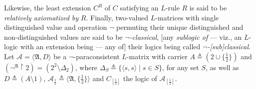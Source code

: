 \documentclass[bsl,meeting]{asl}
\newcommand{\mf}[1]{\mathfrak{#1}}
\newcommand{\mc}[1]{\mathcal{#1}}
\newcommand{\mbf}[1]{\mathbf{#1}}
\newcommand{\couple}[2]{\langle{#1},{#2}\rangle}
\newcommand{\restr}{{\upharpoonright}}
\def\e{{\frac{1}{2}} }
\begin{document}
Likewise, the least extension $C^R$ of $C$
satisfying an $L$-rule $R$
is said to be {\em
relatively axiomatized by\/} $R$.
Finally, two-valued $L$-matrices
with single
distinguished value %
and operation $\neg$ %
permuting their unique distinguished and non-distinguished values
are said to be {\em %
$\neg$-classical},
[any {\em sublogic of\/} --- viz., an $L$-logic with an extension being --- any of] their logics
being called {\em $\neg$-[sub]classical}.
Let $\mc{A}=\couple{\mf{A}}{D}$ be
a $\neg$-paraconsistent $L$-matrix
with carrier $A\triangleq(2\cup\{\e\})$ and
$(\neg^\mf{A}\restr2)=(2^2\setminus\Delta_2)$,
where $\Delta_S\triangleq\{\couple{s}{s}\mid s\in S\}$,
for any set $S$,
as well as %
$D\triangleq(A\setminus1)$,
$\mc{A}_\e\triangleq\couple{\mf{A}}{\{\e\}}$
and $C_{[\e]}$ the logic of $\mc{A}_{[\e]}$. %

\end{document}
